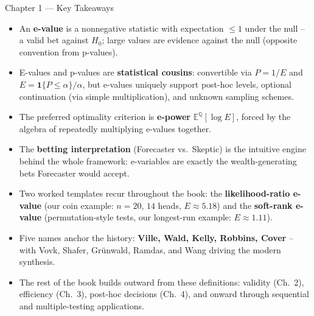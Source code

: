 \documentclass[aspectratio=169,10pt]{beamer}
\begin{document}
\begin{frame}{Chapter 1 --- Key Takeaways}

\begin{itemize}
  \item An \textbf{e-value} is a nonnegative statistic with expectation
    $\le 1$ under the null -- a valid bet against $H_0$; large values are
    evidence against the null (opposite convention from p-values).
  \item E-values and p-values are \textbf{statistical cousins}: convertible
    via $P=1/E$ and $E=\mathbf{1}\{P\le\alpha\}/\alpha$, but e-values
    uniquely support post-hoc levels, optional continuation (via simple
    multiplication), and unknown sampling schemes.
  \item The preferred optimality criterion is \textbf{e-power}
    $\mathbb{E}^{\mathbb{Q}}[\log E]$, forced by the algebra of repeatedly
    multiplying e-values together.
  \item The \textbf{betting interpretation} (Forecaster vs.\ Skeptic) is
    the intuitive engine behind the whole framework: e-variables are
    exactly the wealth-generating bets Forecaster would accept.
  \item Two worked templates recur throughout the book: the
    \textbf{likelihood-ratio e-value} (our coin example: $n=20$, $14$
    heads, $E\approx 5.18$) and the \textbf{soft-rank e-value}
    (permutation-style tests, our longest-run example: $E\approx 1.11$).
  \item Five names anchor the history: \textbf{Ville, Wald, Kelly, Robbins,
    Cover} -- with Vovk, Shafer, Grünwald, Ramdas, and Wang driving the
    modern synthesis.
  \item The rest of the book builds outward from these definitions:
    validity (Ch.\ 2), efficiency (Ch.\ 3), post-hoc decisions (Ch.\ 4),
    and onward through sequential and multiple-testing applications.
\end{itemize}

\end{frame}
\end{document}
